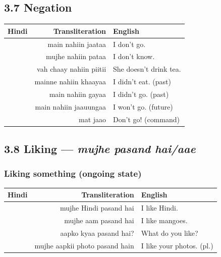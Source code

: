 \subsection{3.7 Negation}


\begin{tabular}{@{}HRG@{}}
  \toprule
  Hindi & Transliteration & English \\
  \midrule
            & main nahiin jaataa      & I don't go. \\
            & mujhe nahiin pataa      & I don't know. \\
         & vah chaay nahiin piitii & She doesn't drink tea. \\
           & mainne nahiin khaayaa   & I didn't eat. (past) \\
              & main nahiin gayaa       & I didn't go. (past) \\
           & main nahiin jaauungaa   & I won't go. (future) \\
                   & mat jaao               & Don't go! (command) \\
  \bottomrule
\end{tabular}

\subsection{3.8 Liking — \textit{mujhe pasand hai/aae}}

\subsubsection*{Liking something (ongoing state)}


\begin{tabular}{@{}HRG@{}}
  \toprule
  Hindi & Transliteration & English \\
  \midrule
                 & mujhe Hindi pasand hai              & I like Hindi. \\
                    & mujhe aam pasand hai                & I like mangoes. \\
                  & aapko kyaa pasand hai?              & What do you like? \\
           & mujhe aapkii photo pasand hain      & I like your photos. (pl.) \\
  \bottomrule
\end{tabular}

